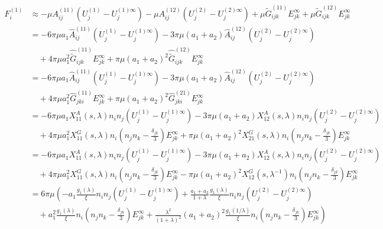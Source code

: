 \documentclass[11pt]{scrartcl}
\begin{document}
\begin{align*}
F^{(1)}_i
&\approx 
- \mu A^{(11)}_{ij}
(U_{j}^{(1)}-U_{j}^{(1)\infty})
- \mu A^{(12)}_{ij}
(U_{j}^{(2)}-U_{j}^{(2)\infty})
+ \mu \tilde{G}^{(11)}_{ijk} E^{\infty}_{jk}
+ \mu \tilde{G}^{(12)}_{ijk} E^{\infty}_{jk} \\
&=
- 6 \pi\mu a_{1} \hat{A}^{(11)}_{ij}(U_{j}^{(1)}-U_{j}^{(1)\infty})
- 3 \pi\mu (a_{1}+a_{2})\hat{A}^{(12)}_{ij} (U_{j}^{(2)}-U_{j}^{(2)\infty})\\
&\quad
+ 4 \pi\mu a_{1}^2 \hat{\tilde{G}}^{(11)}_{ijk} E^{\infty}_{jk}
+ \pi\mu (a_{1}+a_{2})^2 \hat{\tilde{G}}^{(12)}_{ijk} E^{\infty}_{jk} \\
&=
- 6 \pi\mu a_{1} \hat{A}^{(11)}_{ij}
(U_{j}^{(1)}-U_{j}^{(1)\infty})
- 3 \pi\mu (a_{1}+a_{2})\hat{A}^{(12)}_{ij}
(U_{j}^{(2)}-U_{j}^{(2)\infty}) \\
&\quad
+ 4 \pi\mu a_{1}^2 \hat{G}^{(11)}_{jki} E^{\infty}_{jk}
+  \pi\mu (a_{1}+a_{2})^2 \hat{G}^{(21)}_{jki} E^{\infty}_{jk} \\
&=
- 6 \pi\mu a_{1} X_{11}^{A}(s,\lambda) n_i n_j
(U_{j}^{(1)}-U_{j}^{(1)\infty})
- 3 \pi\mu (a_{1}+a_{2}) X_{12}^{A}(s,\lambda) n_i n_j
(U_{j}^{(2)}-U_{j}^{(2)\infty}) \\
&\quad
+ 4 \pi\mu a_{1}^2 X_{11}^{G}(s,\lambda) 
n_i\left(n_j n_k - \frac{\delta_{jk}}{3}  \right) E^{\infty}_{jk}
+  \pi\mu (a_{1}+a_{2})^2
X_{21}^{G}(s,\lambda) 
n_i\left(n_j n_k - 
\frac{\delta_{jk}}{3} \right) E^{\infty}_{jk} \\
&=
- 6 \pi\mu a_{1} X_{11}^{A}(s,\lambda) n_i n_j
(U_{j}^{(1)}-U_{j}^{(1)\infty})
- 3 \pi\mu (a_{1}+a_{2}) X_{12}^{A}(s,\lambda) n_i n_j
(U_{j}^{(2)}-U_{j}^{(2)\infty}) \\
&\quad
+ 4 \pi\mu a_{1}^2 X_{11}^{G} (s,\lambda)
n_i\left(n_j n_k - \frac{\delta_{jk}}{3}  \right) E^{\infty}_{jk}
-  \pi\mu (a_{1}+a_{2})^2 X_{12}^{G}(s,\lambda^{-1})
n_i\left(n_j n_k - 
\frac{\delta_{jk}}{3} \right) E^{\infty}_{jk} \\
&=
6 \pi\mu
\left(
-  a_{1} \frac{g_1(\lambda)}{\xi} n_i n_j
(U_{j}^{(1)}-U_{j}^{(1)\infty})
+ \frac{a_{1}+a_{2}}{1+\lambda} \frac{g_1(\lambda)}{\xi} n_i n_j
(U_{j}^{(2)}-U_{j}^{(2)\infty})\right.
\\
&\quad + 
\left.
 a_{1}^2 \frac{g_1(\lambda)}{\xi} 
n_i\left(n_j n_k - \frac{\delta_{jk}}{3} \right) E^{\infty}_{jk}
+  
\frac{  \lambda^2}{(1+\lambda)^2} 
 (a_{1}+ a_{2})^2
\frac{g_1(1/\lambda)}{\xi} n_i\left(n_j n_k 
- \frac{\delta_{jk}}{3} \right)E^{\infty}_{jk} 
\right)
\end{align*}
\end{document}

